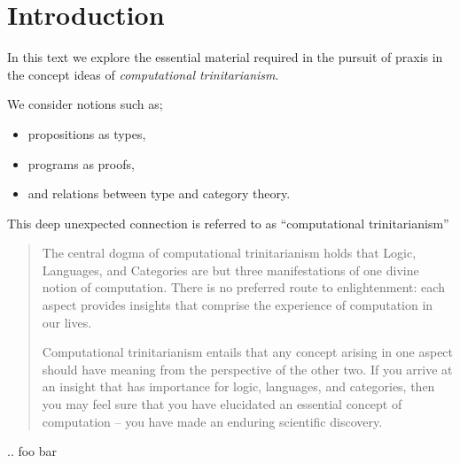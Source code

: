 %
%

\chapter*{Introduction}
\setcounter{page}{1}

In this text we explore the essential material required in the pursuit of praxis
in the concept ideas of \emph{computational trinitarianism}.

We consider notions such as;
\begin{itemize}
  \item propositions as types,
  \item programs as proofs,
  \item and relations between type and category theory.
\end{itemize}

This deep unexpected connection is referred to as
“computational trinitarianism” %

\begin{verse}
The central dogma of computational trinitarianism holds that
Logic, Languages, and Categories are but three manifestations of one divine
notion of computation. There is no preferred route to enlightenment: each
aspect provides insights that comprise the experience of computation in our
lives.

Computational trinitarianism entails that any concept arising in one aspect
should have meaning from the perspective of the other two. If you arrive at an
insight that has importance for logic, languages, and categories, then you may
feel sure that you have elucidated an essential concept of computation – you have
made an enduring scientific discovery.
\end{verse}

..
foo 
bar \label{defn:defeq}
